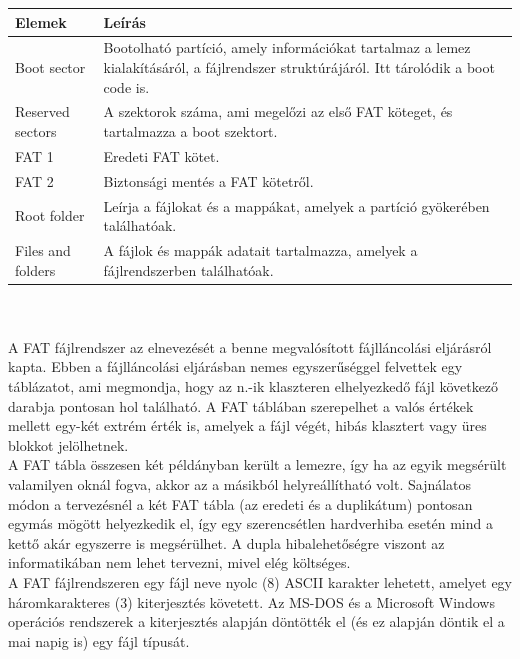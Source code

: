 \documentclass[tikz,12pt,margin=0px]{article}
\begin{document}
    \renewcommand{\arraystretch}{2}
    {\footnotesize
      \begin{tabular}{|p{6cm}|p{9cm}|}
      \hline
        Elemek & Leírás \\ \hline \hline
        Boot sector & Bootolható partíció, amely információkat tartalmaz a lemez kialakításáról, a fájlrendszer struktúrájáról. Itt tárolódik a boot code is. \\ \hline
        Reserved sectors & A szektorok száma, ami megelőzi az első FAT köteget, és tartalmazza a boot szektort. \\ \hline
        FAT 1 & Eredeti FAT kötet. \\ \hline
        FAT 2 & Biztonsági mentés a FAT kötetről. \\ \hline
        Root folder & Leírja a fájlokat és a mappákat, amelyek a partíció gyökerében találhatóak. \\ \hline
        Files and folders & A fájlok és mappák adatait tartalmazza, amelyek a fájlrendszerben találhatóak. \\ \hline
      \end{tabular}
  }
  \renewcommand{\arraystretch}{1}\\\\

    \noindent A FAT fájlrendszer az elnevezését a benne megvalósított fájlláncolási eljárásról kapta. Ebben a fájlláncolási eljárásban nemes egyszerűséggel felvettek egy táblázatot, ami megmondja, hogy az n.-ik klaszteren elhelyezkedő fájl következő darabja pontosan hol található. A FAT táblában szerepelhet a valós értékek mellett egy-két extrém érték is, amelyek a fájl végét, hibás klasztert vagy üres blokkot jelölhetnek.\\

    \noindent A FAT tábla összesen két példányban került a lemezre, így ha az egyik megsérült valamilyen oknál fogva, akkor az a másikból helyreállítható volt. Sajnálatos módon a tervezésnél a két FAT tábla (az eredeti és a duplikátum) pontosan egymás mögött helyezkedik el, így egy szerencsétlen hardverhiba esetén mind a kettő akár egyszerre is megsérülhet. A dupla hibalehetőségre viszont az informatikában nem lehet tervezni, mivel elég költséges.\\

    \noindent A FAT fájlrendszeren egy fájl neve nyolc (8) ASCII karakter lehetett, amelyet egy háromkarakteres (3) kiterjesztés követett. Az MS-DOS és a Microsoft Windows operációs rendszerek a kiterjesztés alapján döntötték el (és ez alapján döntik el a mai napig is) egy fájl típusát.\\
\end{document}
